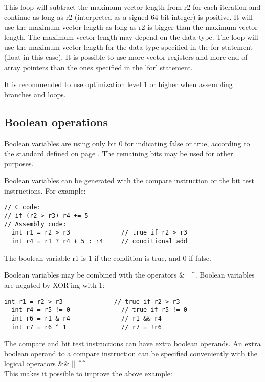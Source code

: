 \documentclass[forwardcom.tex]{subfiles}
\begin{document}
This loop will subtract the maximum vector length from r2 for each iteration and continue as long as r2 (interpreted as a signed 64 bit integer) is positive. It will use the maximum vector length as long as r2 is bigger than the maximum vector length.
The maximum vector length may depend on the data type. The loop will use the maximum vector length for the data type specified in the for statement (float in this case). It is possible to use more vector registers and more end-of-array pointers than the ones specified in the 'for' statement.
\vv

It is recommended to use optimization level 1 or higher when assembling branches and loops.
\vv


\subsection{Boolean operations} \label{BooleanOperations}
Boolean variables are using only bit 0 for indicating false or true, according to the standard defined on page \pageref{booleanRepresentation}. The remaining bits may be used for other purposes.
\vv

Boolean variables can be generated with the compare instruction or the bit test instructions. For example:

\begin{lstlisting}[frame=single]
// C code: 
// if (r2 > r3) r4 += 5
// Assembly code:
  int r1 = r2 > r3              // true if r2 > r3
  int r4 = r1 ? r4 + 5 : r4     // conditional add
\end{lstlisting}
\vv

The boolean variable r1 is 1 if the condition is true, and 0 if false. 
\vv

Boolean variables may be combined with the operators 
\hspace{2mm} \& \hspace{2mm} $\vert$ \hspace{2mm} \^{}. Boolean variables are negated by XOR'ing with 1:
 
\begin{lstlisting}[frame=single]
  int r1 = r2 > r3              // true if r2 > r3
  int r4 = r5 != 0              // true if r5 != 0
  int r6 = r1 & r4              // r1 && r4
  int r7 = r6 ^ 1               // r7 = !r6
\end{lstlisting}
\vv

The compare and bit test instructions can have extra boolean operands. 
An extra boolean operand to a compare instruction can be specified conveniently with the logical operators 
\hspace{2mm} \&\& \hspace{2mm} $\vert\vert$ \hspace{2mm} \^{}\^{} \hspace{2mm}  \\
This makes it possible to improve the above example:
\end{document}
